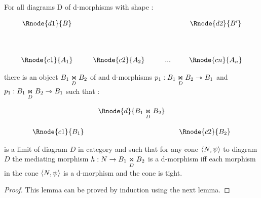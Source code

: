 \documentclass[10pt,a4paper]{article}
\begin{document}
\begin{lemma}
For all diagrams D of d-morphisms with shape \ndidly:
	
\begin{center}
\begin{displaymath}
\begin{array}{cp{0.3cm}c         p{0.3cm}  c p{0.2cm} c}
\Rnode{d1}{B}& &               & &     & &\Rnode{d2}{B'}  \\ [1.4cm]
\Rnode{c1}{A_1}& &\Rnode{c2}{A_2}& & ... & &\Rnode{cn}{A_n}
\end{array}
\end{displaymath}
\end{center}

there is an object  $ \fibrex{B_1}{B_2}{D}$ of  and d-morphisms 
$p_1: \fibrex{B_1}{B_2}{D} \dmorph B_1$ and  $p_1: \fibrex{B_1}{B_2}{D} \dmorph B_1$ such that :

\begin{center}
\begin{displaymath}
\begin{array}{cp{0cm}cp{0cm} c}
            & &\Rnode{d}{\fibrex{B_1}{B_2}{D}}                  \\ [0.6cm]
\Rnode{c1}{B_1}& &                & & \Rnode{c2}{B_2} 
\end{array}
\end{displaymath}
\end{center}

is a limit of diagram $D$ in category  and such that for any cone $\tuple{N,\psi}$ to diagram $D$
the mediating morphism $h: N \morph B_1 \underset{D}{\Join} B_2$ is a d-morphism iff 
each morphism in the cone $\tuple{N,\psi}$ is a d-morphism and the 
cone is tight. 

\end{lemma}
\begin{proof}
\noindent This lemma can be proved by induction using the next lemma.
\end{proof}
\end{document}
